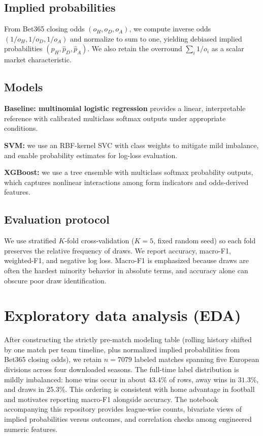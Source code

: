 \documentclass[11pt,a4paper]{article}
\begin{document}
\subsection{Implied probabilities}
From Bet365 closing odds \((o_H,o_D,o_A)\), we compute inverse odds \((1/o_H,1/o_D,1/o_A)\) and normalize to sum to one, yielding debiased implied probabilities \((\hat p_H,\hat p_D,\hat p_A)\). We also retain the overround \(\sum_i 1/o_i\) as a scalar market characteristic.

\subsection{Models}
\textbf{Baseline: multinomial logistic regression} provides a linear, interpretable reference with calibrated multiclass softmax outputs under appropriate conditions.

\textbf{SVM:} we use an RBF-kernel SVC with class weights to mitigate mild imbalance, and enable probability estimates for log-loss evaluation.

\textbf{XGBoost:} we use a tree ensemble with multiclass softmax probability outputs, which captures nonlinear interactions among form indicators and odds-derived features.

\subsection{Evaluation protocol}
We use stratified \(K\)-fold cross-validation (\(K{=}5\), fixed random seed) so each fold preserves the relative frequency of draws. We report accuracy, macro-F1, weighted-F1, and negative log loss. Macro-F1 is emphasized because draws are often the hardest minority behavior in absolute terms, and accuracy alone can obscure poor draw identification.

\section{Exploratory data analysis (EDA)}
After constructing the strictly pre-match modeling table (rolling history shifted by one match per team timeline, plus normalized implied probabilities from Bet365 closing odds), we retain \(n{=}7079\) labeled matches spanning five European divisions across four downloaded seasons. The full-time label distribution is mildly imbalanced: home wins occur in about \(43.4\%\) of rows, away wins in \(31.3\%\), and draws in \(25.3\%\). This ordering is consistent with home advantage in football and motivates reporting macro-F1 alongside accuracy. The notebook accompanying this repository provides league-wise counts, bivariate views of implied probabilities versus outcomes, and correlation checks among engineered numeric features.
\end{document}
